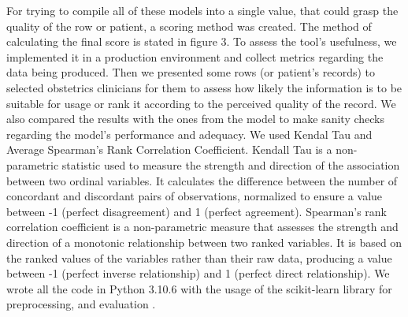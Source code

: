 For trying to compile all of these models into a single value, that could grasp the quality of the row or patient, a scoring method was created. The method of calculating the final score is stated in figure 3. To assess the tool’s usefulness, we implemented it in a production environment and collect metrics regarding the data being produced. Then we presented some rows (or patient's records) to selected obstetrics clinicians for them to assess how likely the information is to be suitable for usage or rank it according to the perceived quality of the record. We also compared the results with the ones from the model to make sanity checks regarding the model’s performance and adequacy. We used Kendal Tau and Average Spearman’s Rank Correlation Coefficient. Kendall Tau is a non-parametric statistic used to measure the strength and direction of the association between two ordinal variables. It calculates the difference between the number of concordant and discordant pairs of observations, normalized to ensure a value between -1 (perfect disagreement) and 1 (perfect agreement). Spearman’s rank correlation coefficient is a non-parametric measure that assesses the strength and direction of a monotonic relationship between two ranked variables. It is based on the ranked values of the variables rather than their raw data, producing a value between -1 (perfect inverse relationship) and 1 (perfect direct relationship).
We wrote all the code in Python 3.10.6 with the usage of the scikit-learn library for preprocessing, and evaluation \cite{scikit-learn}.



